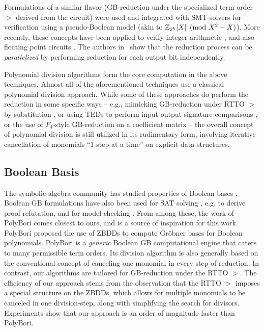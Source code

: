 Formulations of a similar flavor (GB-reduction under the
specialized term order $>$ derived from the circuit) were used
and integrated with SMT-solvers \cite{wedler:date11} for verification
using a pseudo-Boolean model (akin to ${\mathbb{Z}}_{2^k}[X] \pmod{X^2-X}$). More
recently, these concepts have been applied to verify integer
arithmetic \cite{ciesielski:dac2015,rolf:date16}, and also floating
point circuits \cite{rolf:fmcad17}. The authors
in~\cite{cunxi:aspdac17} show that the reduction process can be
{\it parallelized} by performing reduction for each output bit
independently.   

Polynomial division algorithms form the core computation in the above
techniques. Almost all of the 
aforementioned techniques use a classical polynomial division
approach. While some of these approaches
do perform the reduction in 
some specific ways -- e.g., mimicking GB-reduction under RTTO $>$ by
substitution \cite{rolf:date16}, or using TEDs to perform input-output
signature comparisons \cite{ciesielski:flow}, or the use of
$F_4$-style GB-reduction on a coefficient matrix
\cite{lv:tcad2013,pruss:tcad} --  the overall concept of polynomial
division is still utilized in its rudimentary form, involving
iterative cancellation of monomials ``1-step at a time'' on explicit
data-structures. 


\subsection{Boolean \Grobner Basis} 
The symbolic algebra community 
has studied properties of Boolean \Grobner bases 
\cite{michon:bool-ring2006} \cite{polybori:2009}. Boolean GB
formulations have also been used for SAT solving \cite{CEI:stoc-96},
e.g. to derive proof refutation, and for  model checking
\cite{Avrunin:CAV} \cite{vardi-iasted07}. From among these, the work
of PolyBori \cite{polybori:2009} comes closest to ours, and is a
source of inspiration for this work. PolyBori proposed the use of
ZBDDs to compute Gr\"obner bases for Boolean polynomials. PolyBori is
a {\it generic} Boolean GB computational engine that caters to many
permissible term orders. Its division algorithm is also generally
based on the conventional concept of canceling one monomial in every
step of reduction. In contrast, our algorithms are tailored for
GB-reduction under the RTTO $>$. The efficiency of our approach stems
from the observation that the RTTO $>$ imposes a special structure on
the ZBDDs, which allows for multiple monomials to be canceled in one
division-step, along with simplifying the search for
divisors. Experiments show that our approach is an order of magnitude
faster than PolyBori. 



